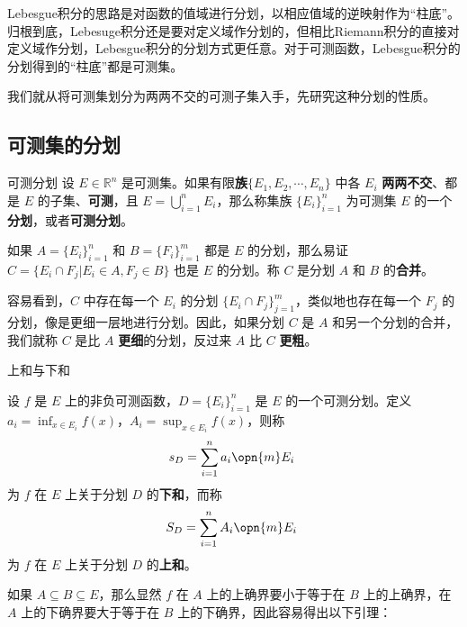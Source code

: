 

Lebesgue积分的思路是对函数的值域进行分划，以相应值域的逆映射作为“柱底”。归根到底，Lebesuge积分还是要对定义域作分划的，但相比Riemann积分的直接对定义域作分划，Lebesgue积分的分划方式更任意。对于可测函数，Lebesgue积分的分划得到的“柱底”都是可测集。

我们就从将可测集划分为两两不交的可测子集入手，先研究这种分划的性质。

\subsection{可测集的分划}

\begin{definition}{可测分划}
设 $E\in\mathbb{R}^n$ 是可测集。如果有限\textbf{族}$\{E_1, E_2, \cdots, E_n\}$ 中各 $E_i$ \textbf{两两不交}、都是 $E$ 的子集、\textbf{可测}，且 $E=\bigcup^n_{i=1}E_i$，那么称集族 $\{E_i\}_{i=1}^n$ 为可测集 $E$ 的一个\textbf{分划}，或者\textbf{可测分划}。
\end{definition}

如果 $A=\{E_i\}_{i=1}^n$ 和 $B=\{F_i\}_{i=1}^m$ 都是 $E$ 的分划，那么易证 $C=\{E_i\cap F_j|E_i\in A, F_j\in B\}$ 也是 $E$ 的分划。称 $C$ 是分划 $A$ 和 $B$ 的\textbf{合并}。

容易看到，$C$ 中存在每一个 $E_i$ 的分划 $\{E_i\cap F_j\}_{j=1}^m$，类似地也存在每一个 $F_j$ 的分划，像是更细一层地进行分划。因此，如果分划 $C$ 是 $A$ 和另一个分划的合并，我们就称 $C$ 是比 $A$ \textbf{更细}的分划，反过来 $A$ 比 $C$ \textbf{更粗}。

\begin{definition}{上和与下和}

设 $f$ 是 $E$ 上的非负可测函数，$D=\{E_i\}_{i=1}^n$ 是 $E$ 的一个可测分划。定义 $a_i=\inf_{x\in E_i}f(x)$，$A_i=\sup_{x\in E_i}f(x)$，则称
\begin{equation}
s_D=\sum_{i=1}^n a_i \opn{m}E_i~
\end{equation}
为 $f$ 在 $E$ 上关于分划 $D$ 的\textbf{下和}，而称
\begin{equation}
S_D=\sum_{i=1}^n A_i \opn{m}E_i~
\end{equation}
为 $f$ 在 $E$ 上关于分划 $D$ 的\textbf{上和}。

\end{definition}

如果 $A\subseteq B\subseteq E$，那么显然 $f$ 在 $A$ 上的上确界要小于等于在 $B$ 上的上确界，在 $A$ 上的下确界要大于等于在 $B$ 上的下确界，因此容易得出以下引理：

